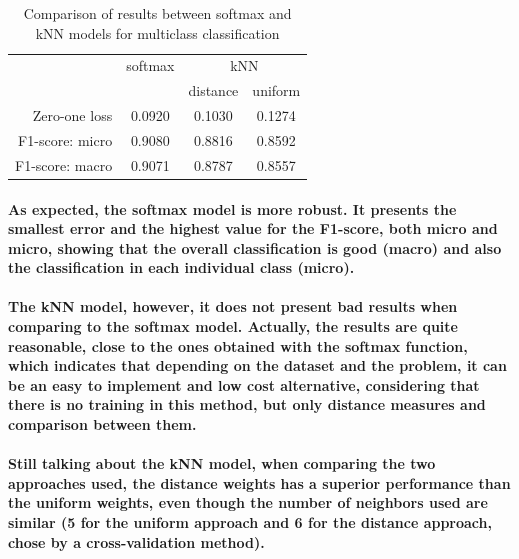 \documentclass[a4paper]{article}    %
\begin{document}
\begin{table}[H]
    \begin{center}
        \begin{tabular}{ r|c|c|c|} 
            \cline{2-4}
            \multicolumn{1}{r}{}
             & \multicolumn{1}{|c|}{softmax}
             & \multicolumn{2}{|c|}{kNN} \\
            \cline{3-4}
            & & distance & uniform \\
            \cline{2-4}
            Zero-one loss   & 0.0920 & 0.1030 & 0.1274 \\
            F1-score: micro & 0.9080 & 0.8816 & 0.8592 \\
            F1-score: macro & 0.9071 & 0.8787 & 0.8557 \\
            \cline{2-4}
        \end{tabular}
    \end{center}
    \caption{Comparison of results between softmax and kNN models for multiclass classification}
    \label{tab:results}
\end{table}

\paragraph{As expected, the softmax model is more robust. It presents the smallest error and the highest value for the F1-score, both micro and micro, showing that the overall classification is good (macro) and also the classification in each individual class (micro).}

\paragraph{The kNN model, however, it does not present bad results when comparing to the softmax model. Actually, the results are quite reasonable, close to the ones obtained with the softmax function, which indicates that depending on the dataset and the problem, it can be an easy to implement and low cost alternative, considering that there is no training in this method, but only distance measures and comparison between them.}

\paragraph{Still talking about the kNN model, when comparing the two approaches used, the distance weights has a superior performance than the uniform weights, even though the number of neighbors used are similar (5 for the uniform approach and 6 for the distance approach, chose by a cross-validation method).}

\end{document}
